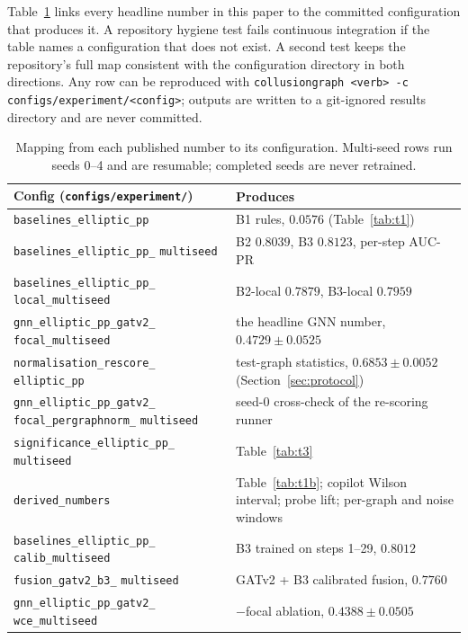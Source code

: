 \documentclass[conference]{IEEEtran}
\begin{document}
Table~\ref{tab:repro} links every headline number in this paper to the
committed configuration that produces it. A repository hygiene test fails
continuous integration if the table names a configuration that does not exist.
A second test keeps the repository's full map consistent with the
configuration directory in both directions. Any row can be reproduced with
\texttt{collusiongraph <verb> -c configs/experiment/<config>}; outputs are
written to a git-ignored results directory and are never committed.

\begin{table}[tp]
\caption{Mapping from each published number to its configuration. Multi-seed
rows run seeds 0--4 and are resumable; completed seeds are never retrained.}
\label{tab:repro}
\centering
\footnotesize
\setlength{\tabcolsep}{4pt}
\begin{tabular}{p{}p{}}
\toprule
Config (\texttt{configs/experiment/}) & Produces \\
\midrule
\texttt{baselines\_elliptic\_pp} & B1 rules, $0.0576$ (Table~\ref{tab:t1}) \\
\texttt{baselines\_elliptic\_pp\_} \texttt{multiseed} & B2 $0.8039$, B3 $0.8123$, per-step AUC-PR \\
\texttt{baselines\_elliptic\_pp\_} \texttt{local\_multiseed} & B2-local $0.7879$, B3-local $0.7959$ \\
\texttt{gnn\_elliptic\_pp\_gatv2\_} \texttt{focal\_multiseed} & the headline GNN number, $0.4729 \pm 0.0525$ \\
\texttt{normalisation\_rescore\_} \texttt{elliptic\_pp} & test-graph statistics, $0.6853 \pm 0.0052$ (Section~\ref{sec:protocol}) \\
\texttt{gnn\_elliptic\_pp\_gatv2\_} \texttt{focal\_pergraphnorm\_} \texttt{multiseed} & seed-0 cross-check of the re-scoring runner \\
\texttt{significance\_elliptic\_pp\_} \texttt{multiseed} & Table~\ref{tab:t3} \\
\texttt{derived\_numbers} & Table~\ref{tab:t1b}; copilot Wilson interval; probe lift; per-graph and noise windows \\
\texttt{baselines\_elliptic\_pp\_} \texttt{calib\_multiseed} & B3 trained on steps 1--29, $0.8012$ \\
\texttt{fusion\_gatv2\_b3\_} \texttt{multiseed} & GATv2 + B3 calibrated fusion, $0.7760$ \\
\texttt{gnn\_elliptic\_pp\_gatv2\_} \texttt{wce\_multiseed} & $-$focal ablation, $0.4388 \pm 0.0505$ \\

\end{tabular}
\end{table}
\end{document}
